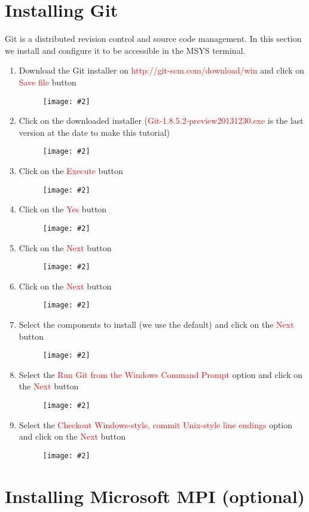 \documentclass[a4paper]{article}
\newcommand{\FIG}[2]
{
	\begin{figure}[ht!]
	\centering
	\texttt{[image: \#2]}
	\end{figure}
}
\newcommand{\FIGURE}[1]{\FIG{0.35}{#1}}
\newcommand{\RED}[1] {\textcolor{red}{#1}}
\begin{document}
\clearpage

\section{Installing Git}

Git is a distributed revision control and source code management. In this
section we install and configure it to be accessible in the MSYS terminal.

\begin{enumerate}

\item Download the Git installer on \RED{http://git-scm.com/download/win} and
click on \RED{Save file} button
\FIGURE{git-1.png}

\clearpage

\item Click on the downloaded installer (\RED{Git-1.8.5.2-preview20131230.exe}
is the last version at the date to make this tutorial)
\FIGURE{git-2.png}

\item Click on the \RED{Execute} button
\FIGURE{git-3.png}

\clearpage

\item Click on the \RED{Yes} button
\FIGURE{git-4.png}

\item Click on the \RED{Next} button
\FIGURE{git-5.png}

\clearpage

\item Click on the \RED{Next} button
\FIGURE{git-6.png}

\item Select the components to install (we use the default) and click on the
\RED{Next} button
\FIGURE{git-7.png}

\clearpage

\item Select the \RED{Run Git from the Windows Command Prompt} option and click
on the \RED{Next} button
\FIGURE{git-8.png}

\item Select the \RED{Checkout Windows-style, commit Unix-style line endings}
option and click on the \RED{Next} button
\FIGURE{git-9.png}

\clearpage

\end{enumerate}

\section{Installing Microsoft MPI (optional)}
\end{document}
